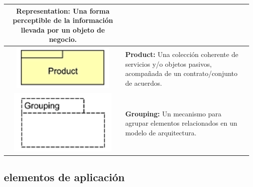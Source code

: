 \begin{longtable}{|c|p{8cm}|}
\textbf{Representation:} Una forma perceptible de la información llevada por un objeto de negocio. \\
\hline
\includegraphics{apendices/ARCHI/business/product.png} & 
\textbf{Product:} Una colección coherente de servicios y/o objetos pasivos, acompañada de un contrato/conjunto de acuerdos. \\
\hline
\includegraphics{apendices/ARCHI/business/grouping.png} &
\textbf{Grouping:} Un mecanismo para agrupar elementos relacionados en un modelo de arquitectura. \\
\end{longtable}

\subsection{elementos de aplicación}


